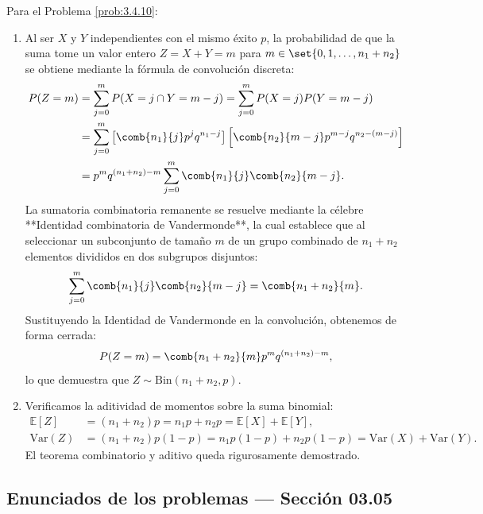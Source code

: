 \begin{solucion}
	\label{sol:3.4.10}
	Para el Problema \ref{prob:3.4.10}:
	\begin{enumerate}
		\item Al ser $X$ y $Y$ independientes con el mismo éxito $p$, la probabilidad de que la suma tome un valor entero $Z = X+Y = m$ para $m \in \set{0, 1, \dots, n_1+n_2}$ se obtiene mediante la fórmula de convolución discreta:
		\begin{align*}
			P(Z = m) &= \sum_{j=0}^m P(X = j \cap Y = m-j) = \sum_{j=0}^m P(X = j)P(Y = m-j) \\
			&= \sum_{j=0}^m \left[ \comb{n_1}{j} p^j q^{n_1-j} \right] \left[ \comb{n_2}{m-j} p^{m-j} q^{n_2-(m-j)} \right] \\
			&= p^m q^{(n_1+n_2)-m} \sum_{j=0}^m \comb{n_1}{j} \comb{n_2}{m-j}.
		\end{align*}
		La sumatoria combinatoria remanente se resuelve mediante la célebre **Identidad combinatoria de Vandermonde**, la cual establece que al seleccionar un subconjunto de tamaño $m$ de un grupo combinado de $n_1 + n_2$ elementos divididos en dos subgrupos disjuntos:
		\begin{align*}
			\sum_{j=0}^m \comb{n_1}{j} \comb{n_2}{m-j} = \comb{n_1+n_2}{m}.
		\end{align*}
		Sustituyendo la Identidad de Vandermonde en la convolución, obtenemos de forma cerrada:
		\begin{align*}
			P(Z = m) = \comb{n_1+n_2}{m} p^m q^{(n_1+n_2)-m},
		\end{align*}
		lo que demuestra que $Z \sim \text{Bin}(n_1+n_2, p)$.
		\item Verificamos la aditividad de momentos sobre la suma binomial:
		\begin{align*}
			\mathbb{E}[Z] &= (n_1 + n_2)p = n_1 p + n_2 p = \mathbb{E}[X] + \mathbb{E}[Y], \\
			\text{Var}(Z) &= (n_1 + n_2)p(1-p) = n_1 p(1-p) + n_2 p(1-p) = \text{Var}(X) + \text{Var}(Y).
		\end{align*}
		El teorema combinatorio y aditivo queda rigurosamente demostrado.
	\end{enumerate}
\end{solucion}


\subsection*{Enunciados de los problemas --- Sección 03.05}

